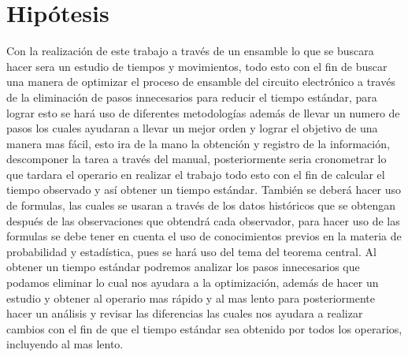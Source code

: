     \section{Hipótesis}
        Con la realización de este trabajo a través de un ensamble lo que se buscara hacer sera un estudio de tiempos y movimientos, todo esto con el fin de buscar una manera de optimizar el proceso de ensamble del circuito electrónico a través de la eliminación de pasos innecesarios para reducir el tiempo estándar, para lograr esto se hará uso de diferentes metodologías además de llevar un numero de pasos los cuales ayudaran a llevar un mejor orden y lograr el objetivo de una manera mas fácil, esto ira de la mano la obtención y registro de la información, descomponer la tarea a través del manual, posteriormente seria cronometrar lo que tardara el operario en realizar el trabajo todo esto con el fin de calcular el tiempo observado y así obtener un tiempo estándar. También se deberá hacer uso de formulas, las cuales se usaran a través de los datos históricos que se obtengan después de las observaciones que obtendrá cada observador, para hacer uso de las formulas se debe tener en cuenta el uso de conocimientos previos en la materia de probabilidad y estadística, pues se hará uso del tema del teorema central.
        Al obtener un tiempo estándar podremos analizar los pasos innecesarios que podamos eliminar lo cual nos ayudara a la optimización, además de hacer un estudio y obtener al operario mas rápido y al mas lento para posteriormente hacer un análisis y revisar las diferencias las cuales nos ayudara a realizar cambios con el fin de que el tiempo estándar sea obtenido por todos los operarios, incluyendo al mas lento.
    
    

